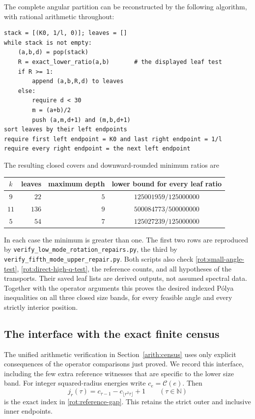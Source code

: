 \documentclass[11pt,reqno]{amsart}
\numberwithin{equation}{section}
\begin{document}
The complete angular partition can be reconstructed by the following
algorithm, with rational arithmetic throughout:
\begin{verbatim}
stack = [(K0, 1/l, 0)]; leaves = []
while stack is not empty:
    (a,b,d) = pop(stack)
    R = exact_lower_ratio(a,b)       # the displayed leaf test
    if R >= 1:
        append (a,b,R,d) to leaves
    else:
        require d < 30
        m = (a+b)/2
        push (a,m,d+1) and (m,b,d+1)
sort leaves by their left endpoints
require first left endpoint = K0 and last right endpoint = 1/l
require every right endpoint = the next left endpoint
\end{verbatim}
The resulting closed covers and downward-rounded minimum ratios are
\begin{center}
\begin{tabular}{c|r|r|c}
 $k$&leaves&maximum depth&lower bound for every leaf ratio\\ \hline
 $9$&$22$&$5$&$125001959/125000000$\\
 $11$&$136$&$9$&$500084773/500000000$\\
 $5$&$54$&$7$&$125027239/125000000$
\end{tabular}
\end{center}
In each case the minimum is greater than one. The first two rows are
reproduced by \nolinkurl{verify_low_mode_rotation_repairs.py}, the
third by \nolinkurl{verify_fifth_mode_upper_repair.py}. Both scripts
also check \eqref{rot:small-angle-test}, \eqref{rot:direct-high-q-test},
the reference counts, and all hypotheses of the transports. Their
saved leaf lists are derived outputs, not assumed spectral data.
Together with the operator arguments this proves the desired indexed
P\'olya inequalities on all three closed size bands, for every feasible
angle and every strictly interior position.

\subsection{The interface with the exact finite census}
\label{rot:finite-certificate}

The unified arithmetic verification in Section~\ref{arith:census} uses
only explicit consequences of the operator comparisons just proved.
We record this interface, including the few extra reference witnesses
that are specific to the lower size band. For integer squared-radius
energies write $c_e=\mathcal C(e)$. Then
\begin{equation}\label{rot:integer-gap}
 j_r(\tau)=c_{\tau-1}-c_{\lfloor r^2\tau\rfloor}+1
 \qquad(\tau\in\mathbb N)
\end{equation}
is the exact index in \eqref{rot:reference-gap}. This retains the strict
outer and inclusive inner endpoints.
\end{document}
